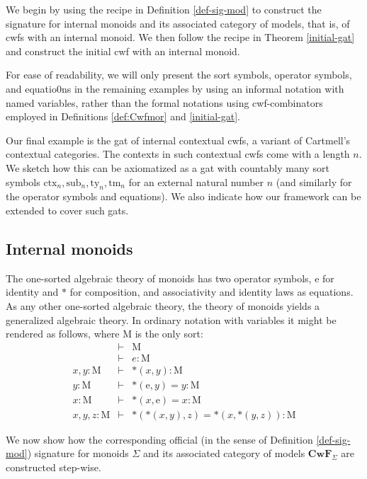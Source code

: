 \documentclass{lmcs}
\def\Cwf{\mathbf{CwF}}
\def\Mon{\mathrm{M}}
\def\idmon{\mathrm{e}}
\def\comp{\mathrm{*}}
\newcommand{\ctx}{\mathrm{ctx}}
\newcommand{\sub}{\mathrm{sub}}
\newcommand{\ty}{\mathrm{ty}}
\newcommand{\tm}{\mathrm{tm}}
\begin{document}
We begin by using the recipe in Definition \ref{def-sig-mod} to construct the signature for internal monoids and its associated category of models, that is, of cwfs with an internal monoid. We then follow the recipe in Theorem \ref{initial-gat} and construct the initial cwf with an internal monoid.

For ease of readability, we will only present the sort symbols, operator symbols, and equatio0ns in the remaining examples by using an informal notation with named variables, rather than the formal notations using cwf-combinators employed in Definitions \ref{def:Cwfmor} and \ref{initial-gat}.

Our final example is the gat of internal contextual cwfs, a variant of Cartmell's contextual categories. The contexts in such contextual cwfs come with a length $n$. We sketch how this can be axiomatized as a gat with countably many sort symbols $\ctx_n, \sub_n, \ty_n, \tm_n$ for an external natural number $n$ (and similarly for the operator symbols and equations). We also indicate how our framework can be extended to cover such gats.

\subsection{Internal monoids}\label{monoids}
 The one-sorted algebraic theory of monoids has two operator symbols,
$\idmon$ for identity and $\comp$ for composition, and associativity and identity laws as equations.
As any other one-sorted algebraic theory, the theory of monoids yields a
generalized algebraic theory. In ordinary notation with variables it might be rendered as follows, where $\Mon$ is the only sort:
\begin{eqnarray*}
&\vdash& \Mon\\
&\vdash& e : \Mon\\
x, y : \Mon &\vdash& \comp(x,y) : \Mon\\
y : \Mon &\vdash& \comp(\idmon,y) = y : \Mon\\
x : \Mon &\vdash& \comp(x,\idmon) = x : \Mon\\
x, y, z : \Mon &\vdash& \comp(\comp(x,y),z) = \comp(x,\comp(y,z)) : \Mon
\end{eqnarray*}

We now show how the corresponding official (in the sense of Definition \ref{def-sig-mod}) signature for monoids $\Sigma$ and its associated category of models $\Cwf_\Sigma$ are constructed step-wise.
\end{document}
